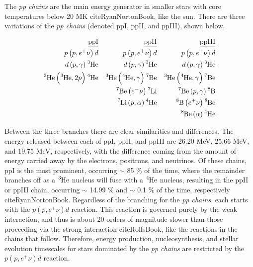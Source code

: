 The \textit{pp chains} are the main energy generator in smaller stars with core temperatures below 20 MK cite{RyanNortonBook}, like the sun. There are three variations of the \textit{pp chains} (denoted ppI, ppII, and ppIII), shown below.

\begin{align*}
\underline{\mathrm{ppI}} & & \underline{\mathrm{ppII}} & &\underline{\mathrm{ppIII}}  & \\
p\left(p, e^{+} \nu \right) d & & p\left(p, e^{+} \nu \right) d & & p\left(p, e^{+} \nu \right) d \\
d\left(p, \gamma \right) \ce{^{3}He} & & d\left(p, \gamma \right) \ce{^{3}He} & & d\left(p, \gamma \right) \ce{^{3}He} \\ 
\ce{^{3}He} \left( \ce{^{3}He}, 2p \right) \ce{^{4}He} & & \ce{^{3}He} \left( \ce{^{4}He}, \gamma \right) \ce{^{7}Be} &  &  \ce{^{3}He} \left( \ce{^{4}He}, \gamma \right) \ce{^{7}Be}  \\
& & \ce{^{7}Be}  \left( e^{-} \nu \right) \ce{^{7}Li} & & \ce{^{7}Be} \left( p, \gamma \right) \ce{^{8}B} \\
& & \ce{^{7}Li} \left( p, \alpha \right) \ce{^{4}He} & & \ce{^{8}B} \left( e^{+} \nu \right) \ce{^{8}Be} \\
& & & & \ce{^{8}Be} \left( \alpha \right) \ce{^{4}He} 
\end{align*}

Between the three branches there are clear similarities and differences. The energy released between each of ppI, ppII, and ppIII are 26.20 MeV, 25.66 MeV, and 19.75 MeV, respectively, with the difference coming from the amount of energy carried away by the electrons, positrons, and neutrinos. Of these chains, ppI is the most prominent, occurring $\sim$ 85 \% of the time, where the remainder branches off as a $\ce{^{3}He}$ nucleus will fuse with a $\ce{^{4}He}$ nucleus, resulting in the ppII or ppIII chain, occurring $\sim$ 14.99 \% and $\sim$ 0.1 \% of the time, respectively cite{RyanNortonBook}. Regardless of the branching for the \textit{pp chains}, each starts with the $p\left(p, e^{+} \nu \right) d$ reaction. This reaction is governed purely by the weak interaction, and thus is about 20 orders of magnitude slower than those proceeding via the strong interaction cite{RolfsBook}, like the reactions in the chains that follow. Therefore, energy production, nucleosynthesis, and stellar evolution timescales for stars dominated by the \textit{pp chains} are restricted by the $p\left(p, e^{+} \nu \right) d$ reaction.

